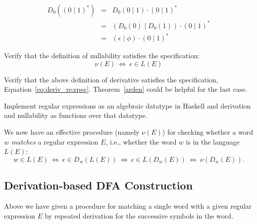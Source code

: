 \begin{example}
\begin{eqnarray*}
D_0( (0 \mid 1)^*) & = & D_0( 0 \mid 1) \cdot (0 \mid 1)^* \\
                   & = & (D_0(0) \mid D_0(1)) \cdot (0 \mid 1)^* \\
                   & = & (\epsilon \mid \phi) \cdot (0 \mid 1)^*
\end{eqnarray*}
\end{example}

\begin{exercise}
Verify that the definition of nullability satisfies the specification:
\begin{equation*}
	\nu(E) ~\Leftrightarrow~ \epsilon \in L(E)
\end{equation*}
\end{exercise}

\begin{exercise}
Verify that the above definition of derivative satisfies the specification, Equation~\ref{eq:deriv_re:spec}. Theorem~\ref{arden} could be helpful for the last case.
\end{exercise}

\begin{exercise}
Implement regular expressions as an algebraic datatype in Haskell and 
derivation and nullability as functions over that datatype.
\end{exercise}

We now have an effective procedure (namely $\nu(E)$) for checking whether a word $w$
\emph{matches} a regular expression $E$, i.e., whether the word $w$ is in the language
$L(E)$:
\begin{equation*}
	w \in L(E) ~\Leftrightarrow~ \epsilon \in D_w(L(E)) ~\Leftrightarrow~ \epsilon \in L(D_w(E)) ~\Leftrightarrow~ \nu(D_w(E)).
\end{equation*}

\subsection{Derivation-based DFA Construction}

Above we have given a procedure for matching a single word with a given regular
expression $E$ by repeated derivation for the successive symbols in the word. 

